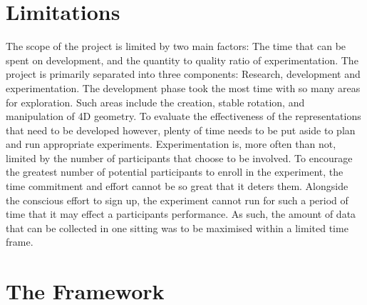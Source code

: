\documentclass{l4proj}
\begin{document}
\section{Limitations}

The scope of the project is limited by two main factors: The time that can be spent on development, and the quantity to quality ratio of experimentation. 
The project is primarily separated into three components: Research, development and experimentation. The development phase took the most time with so many areas for exploration. Such areas include the creation, stable rotation, and manipulation of 4D geometry. To evaluate the effectiveness of the representations that need to be developed however, plenty of time needs to be put aside to plan and run appropriate experiments.
Experimentation is, more often than not, limited by the number of participants that choose to be involved. To encourage the greatest number of potential participants to enroll in the experiment, the time commitment and effort cannot be so great that it deters them. Alongside the conscious effort to sign up, the experiment cannot run for such a period of time that it may effect a participants performance. As such, the amount of data that can be collected in one sitting was to be maximised within a limited time frame.

\section{The Framework}
\label{requirements_framework}
\end{document}
